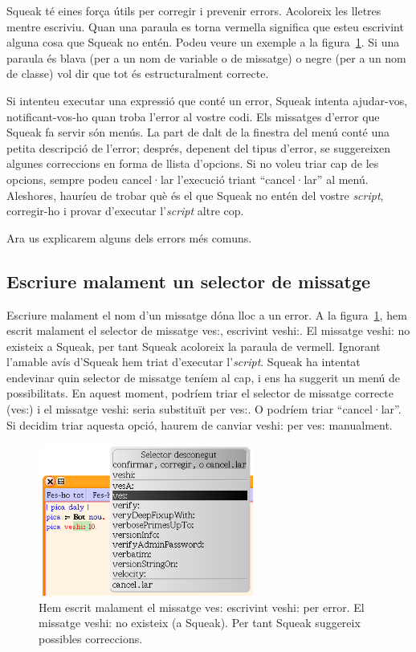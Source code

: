 Squeak té eines força útils per corregir i prevenir errors. Acoloreix les lletres mentre escriviu. Quan una paraula es torna vermella significa que esteu escrivint alguna cosa que Squeak no entén. Podeu veure un exemple a la figura~\ref{fig0205}. Si una paraula és blava (per a un nom de variable o de missatge) o negre (per a un nom de classe) vol dir que tot és estructuralment correcte.

Si intenteu executar una expressió que conté un error, Squeak intenta ajudar-vos, notificant-vos-ho quan troba l'error al vostre codi. Els missatges d'error que Squeak fa servir són menús. La part de dalt de la finestra del menú conté una petita descripció de l'error; després, depenent del tipus d'error, se suggereixen algunes correccions en forma de llista d'opcions. Si no voleu triar cap de les opcions, sempre podeu cancel·lar l'execució triant ``cancel·lar'' al menú. Aleshores, hauríeu de trobar què és el que Squeak no entén del vostre \emph{script}, corregir-ho i provar d'executar l'\emph{script} altre cop.

Ara us explicarem alguns dels errors més comuns.

\subsection{Escriure malament un selector de missatge}
Escriure malament el nom d'un missatge dóna lloc a un error. A la figura~\ref{fig0205}, hem escrit malament el selector de missatge \textsf{ves:}, escrivint \textsf{veshi:}. El missatge \textsf{veshi:} no existeix a Squeak, per tant Squeak acoloreix la paraula de vermell. Ignorant l'amable avís d'Squeak hem triat d'executar l'\emph{script}. Squeak ha intentat endevinar quin selector de missatge teníem al cap, i ens ha suggerit un menú de possibilitats. En aquest moment, podríem triar el selector de missatge correcte (\textsf{ves:}) i el missatge \textsf{veshi:} seria substituït per \textsf{ves:}. O podríem triar ``cancel·lar''. Si decidim triar aquesta opció, haurem de canviar \textsf{veshi:} per \textsf{ves:} manualment.

\begin{figure}[h]
\begin{center}
\includegraphics[height=50mm ,width=71mm ]{Imatges/figura2-5.png}
\end{center}
\caption{Hem escrit malament el missatge \textsf{\upshape ves:} escrivint \textsf{\upshape veshi:} per error. El missatge \textsf{\upshape veshi:} no existeix (a Squeak). Per tant Squeak suggereix possibles correccions.}
\label{fig0205}
\end{figure}

